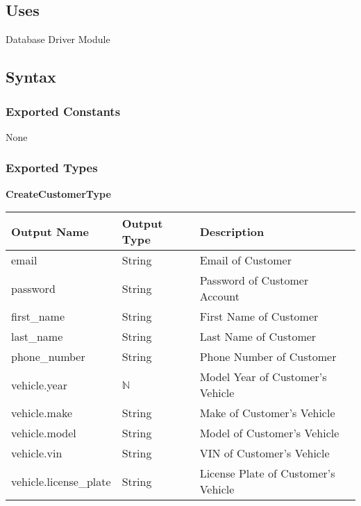 \documentclass[12pt, titlepage]{article}
\begin{document}
\subsection{Uses}

Database Driver Module

\subsection{Syntax}

\subsubsection{Exported Constants}

None

\subsubsection{Exported Types}

\textbf{CreateCustomerType}

\begin{table}[H]
	\begin{tabular}{|l|l|l|}
		\hline
		\textbf{Output Name}   & \textbf{Output Type} & \textbf{Description}                \\
		\hline
		email                  & String               & Email of Customer                   \\
		\hline
		password               & String               & Password of Customer Account        \\
		\hline
		first\_name            & String               & First Name of Customer              \\
		\hline
		last\_name             & String               & Last Name of Customer               \\
		\hline
		phone\_number          & String               & Phone Number of Customer            \\
		\hline
		vehicle.year           & $\mathbb{N}$         & Model Year of Customer's Vehicle    \\
		\hline
		vehicle.make           & String               & Make of Customer's Vehicle          \\
		\hline
		vehicle.model          & String               & Model of Customer's Vehicle         \\
		\hline
		vehicle.vin            & String               & VIN of Customer's Vehicle           \\
		\hline
		vehicle.license\_plate & String               & License Plate of Customer's Vehicle \\
		\hline
	\end{tabular}
\end{table}
\end{document}
